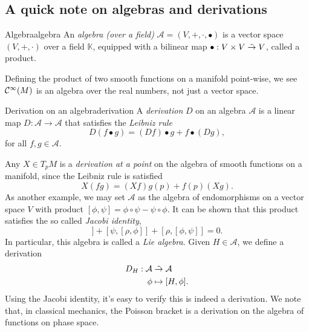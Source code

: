 \subsection{A quick note on algebras and derivations}
\begin{definition}{Algebra}{algebra}
    An \emph{algebra (over a field)} \(\mathcal{A} = (V, +, \cdot, \bullet)\) is a vector space \((V, +, \cdot)\) over a field \(\mathbb{K}\), equipped with a bilinear map \(\bullet : V \times V \mathrel{\tilde{\to}} V\), called a product.
\end{definition}
Defining the product of two smooth functions on a manifold point-wise, we see \(\mathcal{C}^\infty(M)\) is an algebra over the real numbers, not just a vector space.

\begin{definition}{Derivation on an algebra}{derivation}
    A \emph{derivation} \(D\) on an algebra \(\mathcal{A}\) is a linear map \(D : \mathcal{A} \to \mathcal{A}\) that satisfies the \emph{Leibniz rule}
    \begin{equation*}
        D(f\bullet g) = (Df) \bullet g + f \bullet (Dg),
    \end{equation*}
    for all \(f,g \in \mathcal{A}.\)
\end{definition}
Any \(X \in T_pM\) is a \emph{derivation at a point} on the algebra of smooth functions on a manifold, since the Leibniz rule is satisfied
\begin{equation*}
    X(fg) = (Xf)g(p) + f(p)(Xg).
\end{equation*}
As another example, we may set \(\mathcal{A}\) as the algebra of endomorphisms on a vector space \(V\) with product \([\phi, \psi] = \phi \circ \psi - \psi \circ \phi\). It can be shown that this product satisfies the so called \emph{Jacobi identity},
\begin{equation*}
    [\phi, [\psi, \rho]] + [\psi, [\rho, \phi]] + [\rho, [\phi, \psi]] = 0.
\end{equation*}
In particular, this algebra is called a \emph{Lie algebra}. Given \(H \in \mathcal{A}\), we define a derivation
\begin{align*}
    D_H : \mathcal{A} &\mathrel{\tilde{\to}} \mathcal{A}\\
                \phi &\mapsto [H, \phi].
\end{align*}
Using the Jacobi identity, it's easy to verify this is indeed a derivation. We note that, in classical mechanics, the Poisson bracket is a derivation on the algebra of functions on phase space.

